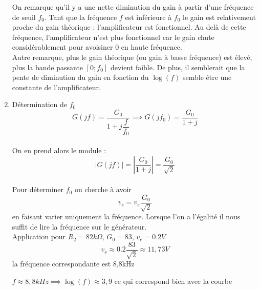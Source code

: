 \documentclass[11pt,a4paper]{article}
\begin{document}
\begin{enumerate}
\begin{bigcenter}
\end{bigcenter}

On remarque qu'il y a une nette diminution du gain à partir d'une fréquence de seuil $f_{0}$.
Tant que la fréquence $f$ est inférieure à $f_{0}$ le gain est relativement proche du gain théorique : l'amplificateur est fonctionnel. Au delà de cette fréquence, l'amplificateur n'est plus fonctionnel car le gain chute considérablement pour avoisiner 0 en haute fréquence.\\
Autre remarque, plus le gain théorique (ou gain à basse fréquence) est élevé, plus la bande passante $\left[0;f_{0}\right]$ devient faible. De plus, il semblerait que la pente de diminution du gain en fonction du $\log(f)$ semble être une constante de l'amplificateur.\\
\item Détermination de $f_{0}$
\[
G(jf)=\dfrac{G_{0}}{1+j\dfrac{f}{f_{0}}}
\implies G(jf_{0})=\dfrac{G_{0}}{1+j}\]
\\On en prend alors le module :\\ \[\left| G(jf)\right|=\left|\dfrac{G_{0}}{1+j}\right|=\dfrac{G_{0}}{\sqrt{2}}\]\\


Pour déterminer $f_{0}$ on cherche à avoir \[v_{s}=v_{e}\dfrac{G_{0}}{\sqrt{2}}\] en faisant varier uniquement la fréquence. Lorsque l'on a l'égalité il nous suffit de lire la fréquence sur le générateur.\\
Application pour $R_{2}=82k\Omega$, $G_{0}=83$, $v_{e}=0.2V$\[v_{s}\approx 0.2\dfrac{83}{\sqrt{2}}\approx 11,73V\] la fréquence correspondante est 8,8kHz

$f\approx8,8kHz \implies \log{(f)}\approx3,9 $ ce qui correspond bien avec la courbe
\end{enumerate}
\end{document}
